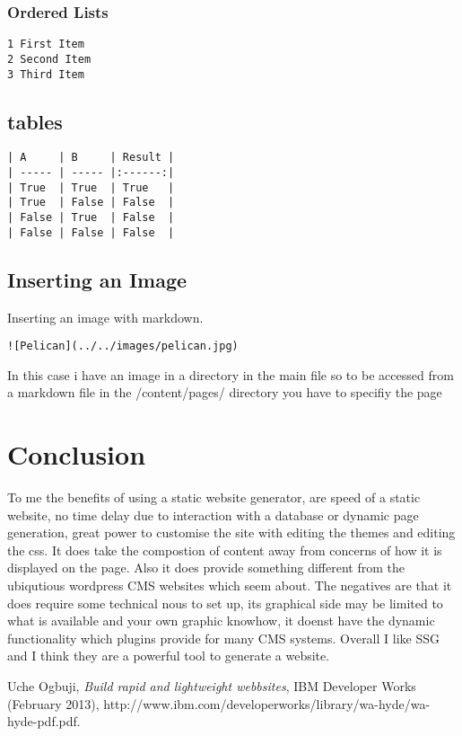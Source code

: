 \documentclass[12pt]{article}			%
\begin{document}
\subsubsection{Ordered Lists}
\begin{verbatim}
1 First Item
2 Second Item
3 Third Item
\end{verbatim}

\subsection{tables}

\begin{verbatim}
| A     | B     | Result |
| ----- | ----- |:------:|
| True  | True  | True   |
| True  | False | False  |
| False | True  | False  |
| False | False | False  |

\end{verbatim}
\subsection{Inserting an Image}
Inserting an image with markdown.
\begin{verbatim}
![Pelican](../../images/pelican.jpg)
\end{verbatim}
In this case i have an image in a directory in the main file so to be accessed from a markdown file in the /content/pages/ directory you have to specifiy the page


\newpage
\section{Conclusion}
To me the benefits of using a static website generator, are speed of a static website,
no time delay due to interaction with a database or dynamic page generation, great power to customise the site with editing the themes and editing the css. It does take the compostion of content away from concerns of how it is displayed on the page.
Also it does provide something different from the ubiqutious wordpress CMS websites which seem about.
The negatives are that it does require some technical nous to set up, its graphical side may be limited to what is available and your own graphic knowhow, it doenst have the dynamic functionality which plugins provide for many CMS systems.
Overall I like SSG and I think they are a powerful tool to generate a website.


\newpage
\begin{thebibliography}{9}

 Uche Ogbuji, \emph{Build rapid and lightweight webbsites}, IBM Developer Works (February 2013), http://www.ibm.com/developerworks/library/wa-hyde/wa-hyde-pdf.pdf.  
\end{thebibliography}
\end{document}
